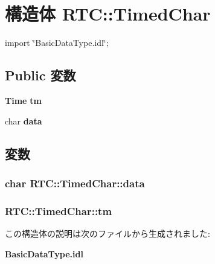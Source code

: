 \section{構造体 RTC::TimedChar}
\label{structRTC_1_1TimedChar}


{\ttfamily import \char`\"{}BasicDataType.idl\char`\"{};}

\subsection*{Public 変数}
\begin{DoxyCompactItemize}
\item 
{\bf Time} {\bf tm}
\item 
char {\bf data}
\end{DoxyCompactItemize}


\subsection{変数}
\subsubsection[{data}]{\setlength{\rightskip}{0pt plus 5cm}char {\bf RTC::TimedChar::data}}\label{structRTC_1_1TimedChar_a448dbbc6aa602a9314da5ce19a49dd59}
\subsubsection[{tm}]{ {\bf RTC::TimedChar::tm}}\label{structRTC_1_1TimedChar_a7c25b6d06dc64102f94a400d6a5b4e0e}


この構造体の説明は次のファイルから生成されました:\begin{DoxyCompactItemize}
\item 
{\bf BasicDataType.idl}\end{DoxyCompactItemize}
